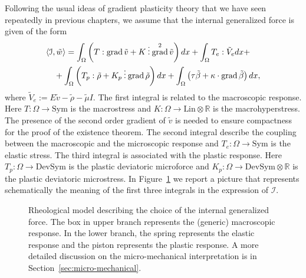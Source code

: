 \documentclass[a4paper,10pt,oneside]{amsbook}
\numberwithin{section}{chapter}
\numberwithin{equation}{chapter}
\theoremstyle{definition}
\DeclareMathOperator{\grad}{grad}
\DeclarePairedDelimiter{\dual}{\langle}{\rangle}
\newcommand{\threedots}{\mathbin{\vdots}}
\begin{document}
Following the usual ideas of gradient plasticity theory that we have seen repeatedly in previous chapters, we assume that the internal generalized force is given of the form
\begin{equation}
\label{eqn:internal-power}
\begin{multlined}
\dual{\mathcal{I},\tilde w}=\int_\Omega\left(T:\grad\tilde v+K\threedots\grad^2\tilde v\right)dx+\int_\Omega T_e:\tilde V_edx+\\
+\int_\Omega\left(T_p:\tilde\rho+K_p\threedots\grad\tilde\rho\right)dx+\int_\Omega\left(\tau\tilde\beta+\kappa\cdot\grad\tilde\beta\right)dx,
\end{multlined}
\end{equation}
where $\tilde V_e:=E\tilde v-\tilde\rho-\tilde\mu I$. The first integral is related to the macroscopic response. Here $T\colon\Omega\to\text{Sym}$ is the macrostress and $K\colon\Omega\to\text{Lin}\otimes\mathbb{R}$ is the macrohyperstress. The presence of the second order gradient of $\tilde v$ is needed to ensure compactness for the proof of the existence theorem. The second integral describe the coupling between the macroscopic and the microscopic response and $T_e\colon\Omega\to\text{Sym}$ is the elastic stress. The third integral is associated with the plastic response. Here $T_p\colon\Omega\to\text{DevSym}$ is the plastic deviatoric microforce and $K_p\colon\Omega\to\text{DevSym}\otimes\mathbb{R}$ is the plastic deviatoric microstress. In Figure~\ref{fig:rheological-new} we
report a picture that represents schematically the meaning of the first three integrals in the expression of $\mathcal{I}$.
\begin{figure}
\centering
{}
\caption{Rheological model describing the choice of the internal generalized force. The
box in upper branch represents the (generic) macroscopic response. In the lower branch,
the spring represents the elastic response and the piston represents the plastic response. A more detailed discussion on the micro-mechanical interpretation is in Section~\ref{sec:micro-mechanical}.}
\label{fig:rheological-new}
\end{figure}
\end{document}
